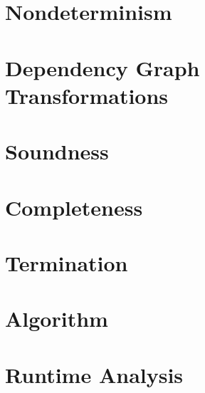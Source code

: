 \section{Nondeterminism}\label{sec:nondet}

\section{Dependency Graph Transformations}\label{sec:dep-graph-trans}

\section{Soundness}\label{sec:bc-soundness}

\section{Completeness}\label{sec:bc-completeness}

\section{Termination}\label{sec:bc-termination}

\section{Algorithm}\label{sec:bc-algorithm}

\section{Runtime Analysis}\label{sec:bc-runtime-analysis}

